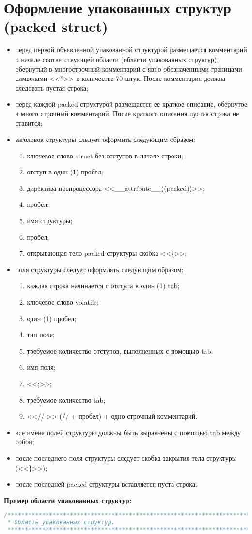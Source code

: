 \section{Оформление упакованных структур (packed struct)}
\begin{itemize}
	\item перед первой объявленной упакованной структурой размещается комментарий о начале соответствующей области (области упакованных структур), обернутый в многострочный комментарий с явно обозначенными границами символами <<*>> в количестве 70 штук. После комментария должна следовать  пустая строка;
	\item перед каждой packed структурой размещается ее краткое описание, обернутое в много строчный комментарий. После краткого описания пустая строка не ставится;
	\item заголовок структуры следует оформить следующим образом:
	\begin{enumerate}
		\item ключевое слово struct без отступов в начале строки;
		\item отступ в один (1) пробел;
		\item директива препроцессора <<\_\_attribute\_\_((packed))>>;
		\item пробел;
		\item имя структуры;
		\item пробел;
		\item открывающая тело packed структуры скобка <<\{>>;
	\end{enumerate}
	\item поля структуры следует оформлять следующим образом:
	\begin{enumerate}
		\item каждая строка начинается с отступа в один (1) tab;
		\item ключевое слово volatile;
		\item один (1) пробел;
		\item тип поля;
		\item требуемое количество отступов, выполненных с помощью tab;
		\item имя поля;
		\item <<;>>;
		\item требуемое количество tab;
		\item <<// >> (// + пробел) + одно строчный комментарий.
	\end{enumerate}
	\item все имена полей структуры должны быть выравнены с помощью tab между собой;
	\item после последнего поля структуры следует скобка закрытия тела структуры (<<\}>>);
	\item после последней packed структуры вставляется пуста строка.
\end{itemize}\textbf{Пример области упакованных структур:}\begin{lstlisting}[language=C++, frame=tlBR, basicstyle=\fontsize{10}{10}\ttfamily]
/**********************************************************************
 * Область упакованных структур.
 **********************************************************************/


\end{lstlisting}
